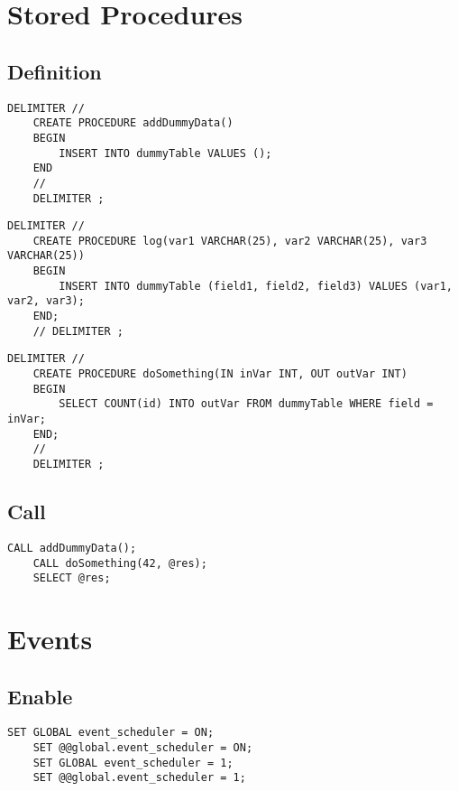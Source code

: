 \documentclass{article}
\begin{document}
\section{Stored Procedures}

\subsection{Definition}

\begin{lstlisting}[style=sql]
    DELIMITER //
    CREATE PROCEDURE addDummyData()
    BEGIN
        INSERT INTO dummyTable VALUES ();
    END
    //
    DELIMITER ;
\end{lstlisting}

\begin{lstlisting}[style=sql]
    DELIMITER //
    CREATE PROCEDURE log(var1 VARCHAR(25), var2 VARCHAR(25), var3 VARCHAR(25))
    BEGIN
        INSERT INTO dummyTable (field1, field2, field3) VALUES (var1, var2, var3);
    END;
    // DELIMITER ;
\end{lstlisting}

\begin{lstlisting}[style=sql]
    DELIMITER //
    CREATE PROCEDURE doSomething(IN inVar INT, OUT outVar INT)
    BEGIN    
        SELECT COUNT(id) INTO outVar FROM dummyTable WHERE field = inVar;
    END;
    //
    DELIMITER ;
\end{lstlisting}

\subsection{Call}

\begin{lstlisting}[style=sql]
    CALL addDummyData();
    CALL doSomething(42, @res);
    SELECT @res;
\end{lstlisting}

\section{Events}

\subsection{Enable}

\begin{lstlisting}[style=sql]
    SET GLOBAL event_scheduler = ON;
    SET @@global.event_scheduler = ON;
    SET GLOBAL event_scheduler = 1;
    SET @@global.event_scheduler = 1;
\end{lstlisting}
\end{document}
